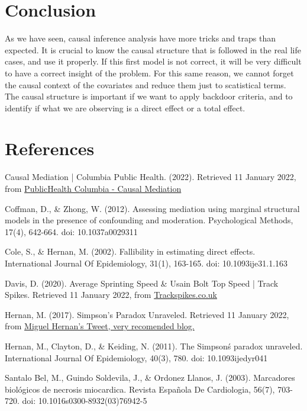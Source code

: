 \documentclass{article}
\begin{document}
\section{Conclusion}

As we have seen, causal inference analysis have more tricks and traps than expected. It is crucial to know the causal structure that is followed in the real life cases, and use it properly. If this first model is not correct, it will be very difficult to have a correct insight of the problem. For this same reason, we cannot forget the causal context of the covariates and reduce them just to scatistical terms. The causal structure is important if we want to apply backdoor criteria, and to identify if what we are observing is a direct effect or a total effect. 


\section{References}

Causal Mediation | Columbia Public Health. (2022). Retrieved 11 January 2022, from \href{https://www.publichealth.columbia.edu/research/population-health-methods/causal-mediation}{PublicHealth Columbia - Causal Mediation}

Coffman, D., \& Zhong, W. (2012). Assessing mediation using marginal structural models in the presence of confounding and moderation. Psychological Methods, 17(4), 642-664. doi: 10.1037\/a0029311

Cole, S., \& Hernan, M. (2002). Fallibility in estimating direct effects. International Journal Of Epidemiology, 31(1), 163-165. doi: 10.1093\/ije\/31.1.163

Davis, D. (2020). Average Sprinting Speed \& Usain Bolt Top Speed | Track Spikes. Retrieved 11 January 2022, from \href{https://trackspikes.co.uk/average-sprinting-speed/#}{Trackspikes.co.uk}

Hernan, M. (2017). Simpson's Paradox Unraveled. Retrieved 11 January 2022, from \href{https://twitter.com/_MiguelHernan/status/860542619818106881?s=20}{Miguel Hernan's Tweet, very recomended blog.}

Hernan, M., Clayton, D., \& Keiding, N. (2011). The Simpson\'s paradox unraveled. International Journal Of Epidemiology, 40(3), 780. doi: 10.1093\/ije\/dyr041

Santalo Bel, M., Guindo Soldevila, J., \& Ordonez Llanos, J. (2003). Marcadores biológicos de necrosis miocardica. Revista Española De Cardiologia, 56(7), 703-720. doi: 10.1016\/s0300-8932(03)76942-5
\end{document}
